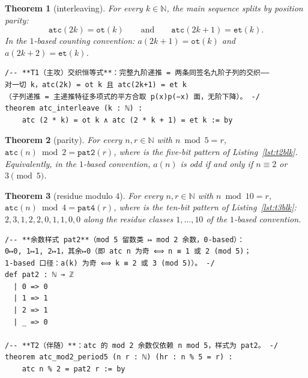 \documentclass[11pt]{article}
\newtheorem{theorem}{Theorem}
\theoremstyle{definition}
\begin{document}
\begin{theorem}[interleaving]\label{thm:t1}
For every $k \in \mathbb{N}$, the main sequence splits by position parity:
\[
  \texttt{atc}(2k) = \texttt{ot}(k)
  \qquad\text{and}\qquad
  \texttt{atc}(2k+1) = \texttt{et}(k).
\]
In the $1$-based counting convention: $a(2k+1) = \texttt{ot}(k)$ and
$a(2k+2) = \texttt{et}(k)$.
\end{theorem}

\begin{lstlisting}[caption={Formal statement of Theorem~\ref{thm:t1}, verbatim
from the frozen statement file \texttt{formalized/01-comb09-4ntwocorner-statements.lean}
(lines 89--93, sha256 \texttt{4cb10838}); the \texttt{:= by} opens the proof body,
which is given in Listing~\ref{lst:t1proof}.},label={lst:t1stmt}]
/-- **T1（主攻）交织恒等式**：完整九阶递推 = 两条同签名九阶子列的交织——
对一切 k，atc(2k) = ot k 且 atc(2k+1) = et k
（子列递推 = 主递推特征多项式的平方合取 p(x)p(−x) 面，无阶下降）。 -/
theorem atc_interleave (k : ℕ) :
    atc (2 * k) = ot k ∧ atc (2 * k + 1) = et k := by
\end{lstlisting}

\begin{theorem}[parity]\label{thm:t2}
For every $n, r \in \mathbb{N}$ with $n \bmod 5 = r$,
$\texttt{atc}(n) \bmod 2 = \texttt{pat2}(r)$, where  is the five-bit
pattern of Listing~\ref{lst:t2blk}. Equivalently, in the $1$-based convention,
$a(n)$ is odd if and only if $n \equiv 2$ or $3 \pmod 5$.
\end{theorem}

\begin{theorem}[residue modulo $4$]\label{thm:t3}
For every $n, r \in \mathbb{N}$ with $n \bmod 10 = r$,
$\texttt{atc}(n) \bmod 4 = \texttt{pat4}(r)$, where  is the ten-bit
pattern of Listing~\ref{lst:t3blk}: $2, 3, 1, 2, 2, 0, 1, 1, 0, 0$ along the
residue classes $1, \dots, 10$ of the $1$-based convention.
\end{theorem}

\begin{lstlisting}[caption={The parity pattern \lean{pat2} and the formal
statement of Theorem~\ref{thm:t2}, verbatim from the frozen statement file
(lines 96--107, sha256 \texttt{4cb10838}).},label={lst:t2blk}]
/-- **余数样式 pat2**（mod 5 留数类 ↦ mod 2 余数，0-based）：
0↦0, 1↦1, 2↦1，其余↦0（即 atc n 为奇 ⟺ n ≡ 1 或 2 (mod 5)；
1-based 口径：a(k) 为奇 ⟺ k ≡ 2 或 3 (mod 5)）。 -/
def pat2 : ℕ → ℤ
  | 0 => 0
  | 1 => 1
  | 2 => 1
  | _ => 0

/-- **T2（伴随）**：atc 的 mod 2 余数仅依赖 n mod 5，样式为 pat2。 -/
theorem atc_mod2_period5 (n r : ℕ) (hr : n % 5 = r) :
    atc n % 2 = pat2 r := by
\end{lstlisting}
\end{document}
